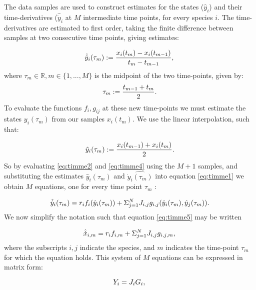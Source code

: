 The data samples are used to construct estimates for the states ($\hat{y}_i$) and their time-derivatives ($\hat{\dot{y}}_i$ at $M$ intermediate time points, for every species $i$. The time-derivatives are estimated to first order, taking the finite difference between samples at two consecutive time points, giving estimates:

\begin{equation}\label{eq:timme2}
\hat{\dot{y}}_{i}(\tau_m) := \frac{x_i(t_m) - x_i(t_{m-1})}{t_m - t_{m-1}},\\
\end{equation}
%
where $\tau_m \in{\mathbb{R}}, m \in{\{1,...,M\}}$ is the midpoint of the two time-points, given by:
%
\begin{equation}\label{eq:timme3}
\tau_m := \frac{t_{m-1} + t_{m}}{2}.\\
\end{equation}
%
To evaluate the functions $f_i, g_{ij}$ at these new time-points we must estimate the states $y_i(\tau_m)$ from our samples $x_i(t_m)$. We use the linear interpolation, such that:

\begin{equation}\label{eq:timme4}
\hat{y}_{i}(\tau_m) := \frac{x_i(t_{m-1}) + x_i(t_{m})}{2}.\\
\end{equation}
%
So by evaluating \eqref{eq:timme2} and \eqref{eq:timme4} using the $M+1$ samples, and substituting the estimates $\hat{y}_i(\tau_m)$ and $\hat{\dot{y}_i(\tau_m)}$ into equation \ref{eq:timme1} we obtain $M$ equations, one for every time point $\tau_m$ :

\begin{equation}\label{eq:timme5}
\hat{\dot{y}}_{i}(\tau_m) = r_if_{i}(\hat{y}_i(\tau_m)) + \Sigma_{j=1}^{N}J_{i,j}g_{i,j}(\hat{y}_i(\tau_m), \hat{y}_j(\tau_m)).\\
\end{equation}
%
We now simplify the notation such that equation \ref{eq:timme5} may be written 

\begin{equation}\label{eq:timme6}
\hat{\dot{x}}_{i,m} = r_if_{i,m} + \Sigma_{j=1}^{N}J_{i,j}g_{i,j,m},\\
\end{equation}
%
where the subscripts  $i,j$ indicate the species, and $m$ indicates the time-point $\tau_m$ for which the equation holds. This system of $M$ equations can be expressed in matrix form:

\begin{equation}\label{eq:timme7}
Y_{i} = J_iG_i,\\
\end{equation}


